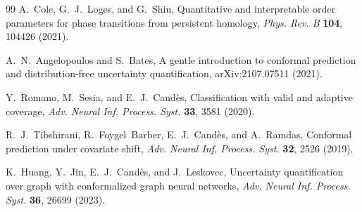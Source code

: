 \documentclass[aps,prresearch,reprint,amsmath,amssymb,nofootinbib,superscriptaddress,floatfix]{revtex4-2}
\theoremstyle{definition}
\theoremstyle{remark}
\theoremstyle{plain}
\begin{document}
\begin{thebibliography}{99}
A.~Cole, G.~J.~Loges, and G.~Shiu,
Quantitative and interpretable order parameters for phase transitions from persistent homology,
\emph{Phys. Rev. B} \textbf{104}, 104426 (2021).

A.~N.~Angelopoulos and S.~Bates,
A gentle introduction to conformal prediction and distribution-free uncertainty quantification,
arXiv:2107.07511 (2021).

Y.~Romano, M.~Sesia, and E.~J.~Cand\`es,
Classification with valid and adaptive coverage,
\emph{Adv. Neural Inf. Process. Syst.} \textbf{33}, 3581 (2020).

R.~J.~Tibshirani, R.~Foygel~Barber, E.~J.~Cand\`es, and A.~Ramdas,
Conformal prediction under covariate shift,
\emph{Adv. Neural Inf. Process. Syst.} \textbf{32}, 2526 (2019).

K.~Huang, Y.~Jin, E.~J.~Cand\`es, and J.~Leskovec,
Uncertainty quantification over graph with conformalized graph neural networks,
\emph{Adv. Neural Inf. Process. Syst.} \textbf{36}, 26699 (2023).


\end{thebibliography}
\end{document}
